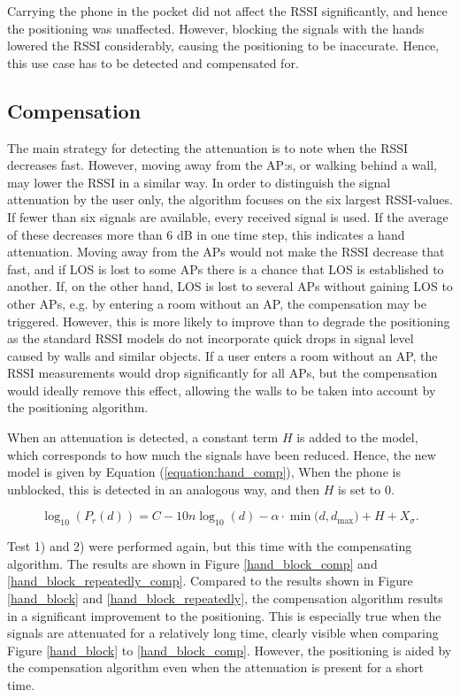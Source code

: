 \documentclass{LTHthesis}
\begin{document}
%
Carrying the phone in the pocket did not affect the RSSI significantly, and hence the positioning was unaffected. However, blocking the signals with the hands lowered the RSSI considerably, causing the positioning to be inaccurate. Hence, this use case has to be detected and compensated for.

\subsection{Compensation}

The main strategy for detecting the attenuation is to note when the RSSI decreases fast. However, moving away from the AP:s, or walking behind a wall, may lower the RSSI in a similar way. In order to distinguish the signal attenuation by the user only, the algorithm focuses on the six largest RSSI-values. If fewer than six signals are available, every received signal is used. If the average of these decreases more than 6 dB in one time step, this indicates a hand attenuation. Moving away from the APs would not make the RSSI decrease that fast, and if LOS is lost to some APs there is a chance that LOS is established to another. If, on the other hand, LOS is lost to several APs without gaining LOS to other APs, e.g. by entering a room without an AP, the compensation may be triggered. However, this is more likely to improve than to degrade the positioning as the standard RSSI models do not incorporate quick drops in signal level caused by walls and similar objects. If a user enters a room without an AP, the RSSI measurements would drop significantly for all APs, but the compensation would ideally remove this effect, allowing the walls to be taken into account by the positioning algorithm. 

When an attenuation is detected, a constant term $H$ is added to the model, which corresponds to how much the signals have been reduced. Hence, the new model is given by Equation (\ref{equation:hand_comp}),  When the phone is unblocked, this is detected in an analogous way, and then $H$ is set to 0. 

\begin{equation}
\log_{10}({P_r(d)})=C-10n\log_{10}(d) - \alpha\cdot\min({d, d_{\text{max}})}+H+ X_\sigma.
\label{equation:hand_comp}
\end{equation}

Test 1) and 2) were performed again, but this time with the compensating algorithm. The results are shown in Figure \ref{hand_block_comp} and \ref{hand_block_repeatedly_comp}. Compared to the results shown in Figure \ref{hand_block} and \ref{hand_block_repeatedly}, the compensation algorithm results in a significant improvement to the positioning. This is especially true when the signals are attenuated for a relatively long time, clearly visible when comparing Figure \ref{hand_block} to \ref{hand_block_comp}. However, the positioning is aided by the compensation algorithm even when the attenuation is present for a short time.  
\end{document}
